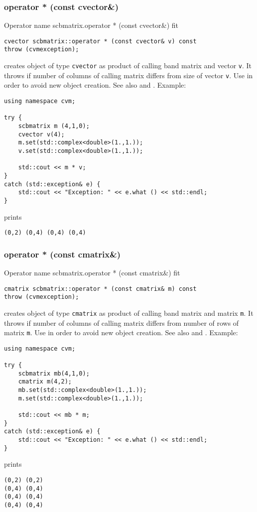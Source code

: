 \subsubsection{operator * (const cvector\&)}
Operator%
\pdfdest name {scbmatrix.operator * (const cvector&)} fit
\begin{verbatim}
cvector scbmatrix::operator * (const cvector& v) const
throw (cvmexception);
\end{verbatim}
creates  object of type \verb"cvector"
as  product of  calling band matrix and  vector \verb"v".
It throws  
if  number of columns of  calling matrix
differs from  size of  vector \verb"v".
Use 
in order to avoid new object creation.
See also
 and .
Example:
\begin{Verbatim}
using namespace cvm;

try {
    scbmatrix m (4,1,0);
    cvector v(4);
    m.set(std::complex<double>(1.,1.));
    v.set(std::complex<double>(1.,1.));

    std::cout << m * v;
}
catch (std::exception& e) {
    std::cout << "Exception: " << e.what () << std::endl;
}
\end{Verbatim}
prints
\begin{Verbatim}
(0,2) (0,4) (0,4) (0,4)
\end{Verbatim}
\newpage



\subsubsection{operator * (const cmatrix\&)}
Operator%
\pdfdest name {scbmatrix.operator * (const cmatrix&)} fit
\begin{verbatim}
cmatrix scbmatrix::operator * (const cmatrix& m) const
throw (cvmexception);
\end{verbatim}
creates  object of type \verb"cmatrix"
as  product of  calling band matrix and  matrix \verb"m".
It throws  
if  number of columns of  calling matrix
differs from  number of rows of  matrix \verb"m".
Use  in order to avoid
 new object creation.
See also
 and .
Example:
\begin{Verbatim}
using namespace cvm;

try {
    scbmatrix mb(4,1,0);
    cmatrix m(4,2);
    mb.set(std::complex<double>(1.,1.));
    m.set(std::complex<double>(1.,1.));

    std::cout << mb * m;
}
catch (std::exception& e) {
    std::cout << "Exception: " << e.what () << std::endl;
}
\end{Verbatim}
prints
\begin{Verbatim}
(0,2) (0,2)
(0,4) (0,4)
(0,4) (0,4)
(0,4) (0,4)
\end{Verbatim}
\newpage




